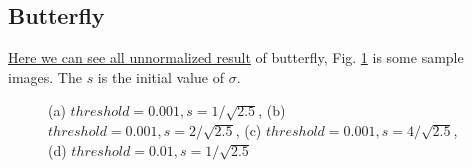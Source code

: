 \documentclass[final]{cvpr}
\begin{document}
\begin{appendices}
\subsection{Butterfly}
\href{https://github.com/Arctic-Xiangjian/assignment2/tree/main/unnormalized}{Here we can see all unnormalized result} of butterfly, Fig. \ref{fig: unnormalizedbut} is some sample images. The $s$ is the initial value of $\sigma$.
\begin{figure}[htbp]
  \centering
  \quad
  \quad
  \quad
  \caption{(a) $threshold=0.001, s=1/\sqrt{2.5}$, (b) $threshold=0.001, s=2/\sqrt{2.5}$, (c) $threshold=0.001, s=4/\sqrt{2.5}$, (d) $threshold=0.01, s=1/\sqrt{2.5}$}
  \label{fig: unnormalizedbut}
  \end{figure}


\end{appendices}
\end{document}
